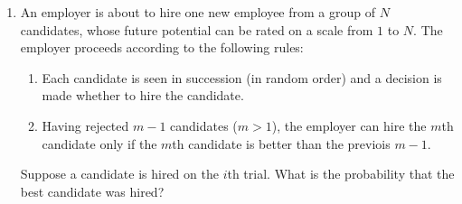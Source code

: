 \documentclass[12pt]{article}
\theoremstyle{definition}
\theoremstyle{plain}
\newenvironment{solution}
  {\begin{proof}[Solution]}
  {\end{proof}}
\newcommand{\deriv}[1]{\frac{\text{d}}{\text{d} #1}}
\begin{document}
\begin{enumerate}
\begin{solution}
\begin{enumerate}
		Thus the probability of hitting region $ i $ is 
		\[ P(X = i) = \frac{ \frac{\pi r^2}{25} (11 - 2i) }{\pi r^2} = \frac{11 - 2i}{25}.\]
	
	\item It is easy to see that as $ i $ increases, $ P(X = i) $ decreases. Taking the derivative of the function,
		\begin{align*}
			\deriv{x} P(x) &= \frac{-2}{25} < 0.
		\end{align*}
		This holds for all $ x \in \mathbb{R} $, hence $ P(X) $ is a decreasing function.
		
	\item The function $ P(X) $ given above has domain $ S = \{ 1, 2, 3, 4, 5\} $, which is the sample space. To prove that $ P $ is indeed a probability function, we will show that it satisfies the conditions of Theorem $ 1.2.6 $, from which it follows that $ P $ is a probability function. Let $ p_i := P(X = i) $ which we will show all sum to $ 1 $. 
	\begin{align*}
		\sum_{i = 1}^5 p_i &= \sum_{i = 1}^5 \frac{11 - 2i}{25}\\
		&= \frac{\sum_{i=1}^5 11 - 2 \sum_{i=1}^5 i}{25}\\
		&= \frac{5*11 - 2 \frac{5*6}{2} }{25}\\
		&= \frac{55 - 30}{25} \\
		&= \frac{25}{25} = 1.
	\end{align*}
	The probability function from the Theorem induced by the $ p_i $'s above coincides with $ P(X) $ since $ P( \{i\}) = \sum_{\{i \mid i \in \{i\} \} }p_i = p_i $, for all $ i \in S $.
	\end{enumerate} 
	\end{solution}
	

\setcounter{enumi}{31}
\item An employer is about to hire one new employee from a group of $ N $ candidates, whose future potential can be rated on a scale from $ 1 $ to $ N $. The employer proceeds 
according to the following rules:
	\begin{enumerate}
	\item Each candidate is seen in succession (in random order) and a decision is made whether to hire the candidate.
	\item Having rejected $ m - 1 $ candidates ($ m > 1 $), the employer can hire the $ m $th candidate only if the $ m $th candidate is better than the previois $ m - 1 $.
	\end{enumerate}
Suppose a candidate is hired on the $ i $th trial. What is the probability that the best candidate was hired?


\end{enumerate}
\end{document}
